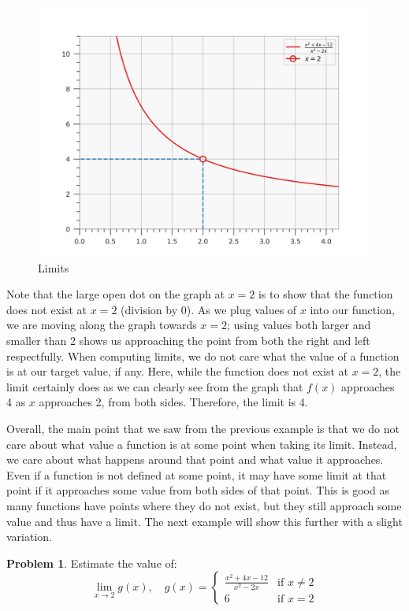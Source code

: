 \documentclass[12pt]{article}
\theoremstyle{definition}
\newtheorem{problem}{Problem}
\begin{document}
\begin{figure}[H]
    \centering
    \includegraphics[width=12.5cm, keepaspectratio]{limits_1.png}
    \caption{Limits}
    \label{fig:fig1}
\end{figure}

Note that the large open dot on the graph at $x=2$ is to show that the function does not exist at $x=2$ (division by 0).
As we plug values of $x$ into our function, we are moving along the graph towards $x=2$; using values both larger and smaller than 2 shows us approaching the point from both the right and left respectfully.
When computing limits, we do not care what the value of a function is at our target value, if any.
Here, while the function does not exist at $x=2$, the limit certainly does as we can clearly see from the graph that $f(x)$ approaches 4 as $x$ approaches 2, from both sides.
Therefore, the limit is 4.

Overall, the main point that we saw from the previous example is that we do not care about what value a function is at some point when taking its limit.
Instead, we care about what happens around that point and what value it approaches.
Even if a function is not defined at some point, it may have some limit at that point if it approaches some value from both sides of that point.
This is good as many functions have points where they do not exist, but they still approach some value and thus have a limit.
The next example will show this further with a slight variation.

\begin{problem}
Estimate the value of:
\begin{equation*}
    \lim_{x \to 2} g(x), \quad g(x) =
    \begin{cases}
        \frac{x^2+4x-12}{x^2-2x} & \text{if } x \neq 2 \\
        6                        & \text{if } x = 2
    \end{cases} \label{eq:3}
\end{equation*}
\end{problem}
\end{document}
